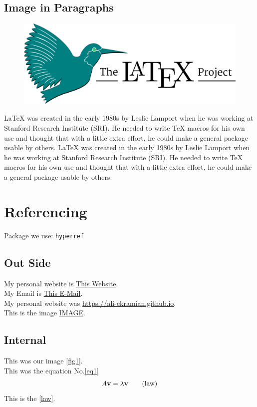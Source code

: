 \documentclass[12pt]{article}
\begin{document}
	\subsection{Image in Paragraphs}
	\begin{figure}
		\centering
		\includegraphics[width=\linewidth]{pic1.png}
	\end{figure}
		LaTeX was created in the early 1980s by Leslie Lamport when he was working at Stanford Research Institute (SRI). He needed to write TeX macros for his own use and thought that with a little extra effort, he could make a general package usable by others. 	LaTeX was created in the early 1980s by Leslie Lamport when he was working at Stanford Research Institute (SRI). He needed to write TeX macros for his own use and thought that with a little extra effort, he could make a general package usable by others.
	\section{Referencing}
	Package we use: \texttt{hyperref}
	\subsection{Out Side}
	My personal website is \href{https://ali-ekramian.github.io}{This Website}.\\
	My Email is \href{mailto:ali.ekramian@yahoo.com}{This E-Mail}.\\
	My personal website was \url{https://ali-ekramian.github.io}.\\
	This is the image \href{run:pic1.png}{IMAGE}.\\
	\subsection{Internal}
	This was our image \ref{fig1}.\\
	This was the equation No.\eqref{eq1}
	\begin{equation}
		A \vb{v} = \lambda \vb{v}
		\label{law}
		\tag{law}
	\end{equation}
	This is the \ref{law}.
\end{document}
